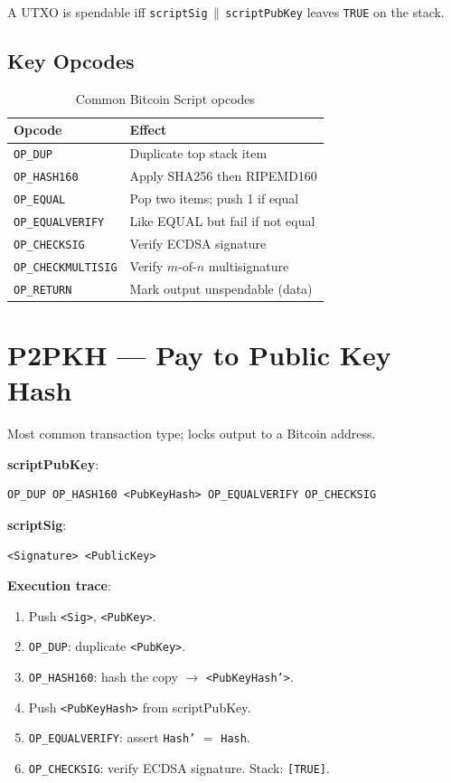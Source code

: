 \documentclass[12pt,a4paper,openany]{book}
\theoremstyle{definition}
\theoremstyle{plain}
\theoremstyle{remark}
\begin{document}
A UTXO is spendable iff \texttt{scriptSig}\,$\|$\,\texttt{scriptPubKey}
leaves \texttt{TRUE} on the stack.

\subsection{Key Opcodes}

\begin{table}[h]
\centering
\caption{Common Bitcoin Script opcodes}
\begin{tabular}{ll}
\toprule
\textbf{Opcode} & \textbf{Effect} \\
\midrule
\texttt{OP\_DUP}          & Duplicate top stack item \\
\texttt{OP\_HASH160}      & Apply SHA256 then RIPEMD160 \\
\texttt{OP\_EQUAL}        & Pop two items; push 1 if equal \\
\texttt{OP\_EQUALVERIFY}  & Like EQUAL but fail if not equal \\
\texttt{OP\_CHECKSIG}     & Verify ECDSA signature \\
\texttt{OP\_CHECKMULTISIG}& Verify $m$-of-$n$ multisignature \\
\texttt{OP\_RETURN}       & Mark output unspendable (data) \\
\bottomrule
\end{tabular}
\end{table}

\section{P2PKH — Pay to Public Key Hash}

Most common transaction type; locks output to a Bitcoin address.

\textbf{scriptPubKey}:
\begin{lstlisting}[language={}]
OP_DUP OP_HASH160 <PubKeyHash> OP_EQUALVERIFY OP_CHECKSIG
\end{lstlisting}

\textbf{scriptSig}:
\begin{lstlisting}[language={}]
<Signature> <PublicKey>
\end{lstlisting}

\textbf{Execution trace}:
\begin{enumerate}
  \item Push \texttt{<Sig>}, \texttt{<PubKey>}.
  \item \texttt{OP\_DUP}: duplicate \texttt{<PubKey>}.
  \item \texttt{OP\_HASH160}: hash the copy $\to$ \texttt{<PubKeyHash'>}.
  \item Push \texttt{<PubKeyHash>} from scriptPubKey.
  \item \texttt{OP\_EQUALVERIFY}: assert \texttt{Hash'} $=$ \texttt{Hash}.
  \item \texttt{OP\_CHECKSIG}: verify ECDSA signature. Stack: \texttt{[TRUE]}.
\end{enumerate}
\end{document}
